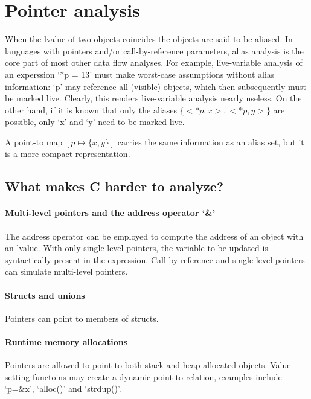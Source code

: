 \section{Pointer analysis}

When the lvalue of two objects coincides the objects are said to be aliased. In
languages with pointers and/or call-by-reference parameters, alias analysis is
the core part of most other data flow analyses. For example, live-variable
analysis of an experssion `*p = 13' must make worst-case assumptions without
alias information: `p' may reference all (visible) objects, which then
subsequently must be marked live. Clearly, this renders live-variable analysis
nearly useless. On the other hand, if it is known that only the aliases
$\{<*p, x>, <*p, y>\}$ are possible, only `x' and `y' need to be marked live.

A point-to map $[p \mapsto \{x, y\}]$ carries the same information as an alias
set, but it is a more compact representation.

\subsection{What makes C harder to analyze?}

\paragraph{Multi-level pointers and the address operator `\&'}
The address operator can be employed to compute the address of an object with an
lvalue. With only single-level pointers, the variable to be updated is
syntactically present in the expression. Call-by-reference and single-level
pointers can simulate multi-level pointers.

\paragraph{Structs and unions}
Pointers can point to members of structs.

\paragraph{Runtime memory allocations}
Pointers are allowed to point to both stack and heap allocated objects. Value
setting functoins may create a dynamic point-to relation, examples include
`p=\&x', `alloc()' and `strdup()'.


